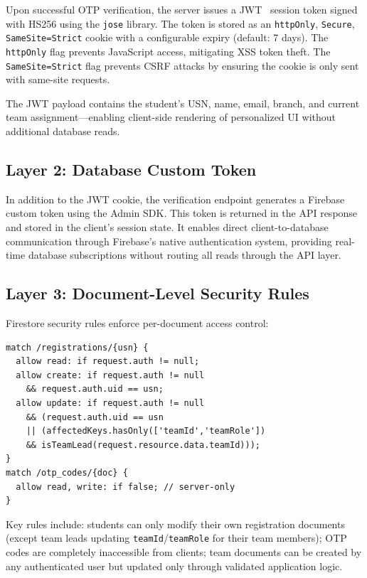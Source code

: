 \documentclass[conference]{IEEEtran}
\begin{document}
Upon successful OTP verification, the server issues a JWT~\cite{jones2015} session token signed with HS256 using the \texttt{jose} library. The token is stored as an \texttt{httpOnly}, \texttt{Secure}, \texttt{SameSite=Strict} cookie with a configurable expiry (default: 7 days). The \texttt{httpOnly} flag prevents JavaScript access, mitigating XSS token theft. The \texttt{SameSite=Strict} flag prevents CSRF attacks by ensuring the cookie is only sent with same-site requests.

The JWT payload contains the student's USN, name, email, branch, and current team assignment---enabling client-side rendering of personalized UI without additional database reads.

\subsection{Layer 2: Database Custom Token}

In addition to the JWT cookie, the verification endpoint generates a Firebase custom token using the Admin SDK. This token is returned in the API response and stored in the client's session state. It enables direct client-to-database communication through Firebase's native authentication system, providing real-time database subscriptions without routing all reads through the API layer.

\subsection{Layer 3: Document-Level Security Rules}

Firestore security rules enforce per-document access control:

\begin{lstlisting}[language={}, caption={Firestore Security Rules (excerpt)}, label={lst:rules}]
match /registrations/{usn} {
  allow read: if request.auth != null;
  allow create: if request.auth != null
    && request.auth.uid == usn;
  allow update: if request.auth != null
    && (request.auth.uid == usn
    || (affectedKeys.hasOnly(['teamId','teamRole'])
    && isTeamLead(request.resource.data.teamId)));
}
match /otp_codes/{doc} {
  allow read, write: if false; // server-only
}
\end{lstlisting}

Key rules include: students can only modify their own registration documents (except team leads updating \texttt{teamId}/\texttt{teamRole} for their team members); OTP codes are completely inaccessible from clients; team documents can be created by any authenticated user but updated only through validated application logic.
\end{document}
